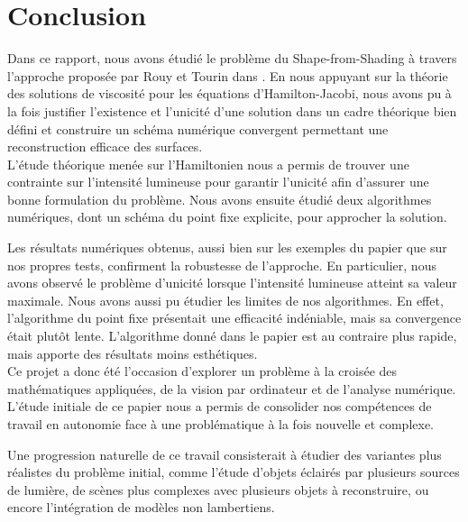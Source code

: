 \section{Conclusion}

Dans ce rapport, nous avons étudié le problème du Shape-from-Shading à travers l’approche proposée par Rouy et Tourin dans \cite{Rouy_et_Turin}. En nous appuyant sur la théorie des solutions de viscosité pour les équations d’Hamilton-Jacobi, nous avons pu à la fois justifier l'existence et l'unicité d'une solution dans un cadre théorique bien défini et construire un schéma numérique convergent permettant une reconstruction efficace des surfaces.\\

L’étude théorique menée sur l’Hamiltonien nous a permis de trouver une contrainte sur l’intensité lumineuse pour garantir l’unicité afin d'assurer une bonne formulation du problème. Nous avons ensuite étudié deux algorithmes numériques, dont un schéma du point fixe explicite, pour approcher la solution. 

Les résultats numériques obtenus, aussi bien sur les exemples du papier que sur nos propres tests, confirment la robustesse de l’approche. En particulier, nous avons observé le problème d’unicité lorsque l’intensité lumineuse atteint sa valeur maximale. Nous avons aussi pu étudier les limites de nos algorithmes. En effet, l'algorithme du point fixe présentait une efficacité indéniable, mais sa convergence était plutôt lente. L'algorithme donné dans le papier est au contraire plus rapide, mais apporte des résultats moins esthétiques. \\

Ce projet a donc été l’occasion d’explorer un problème à la croisée des mathématiques appliquées, de la vision par ordinateur et de l’analyse numérique. L’étude initiale de ce papier nous a permis de consolider nos compétences de travail en autonomie face à une problématique à la fois nouvelle et complexe. 

Une progression naturelle de ce travail consisterait à étudier des variantes plus réalistes du problème initial, comme l’étude d'objets éclairés par plusieurs sources de lumière, de scènes plus complexes avec plusieurs objets à reconstruire, ou encore l'intégration de modèles non lambertiens.


